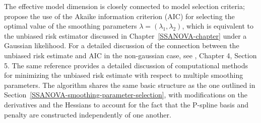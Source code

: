 The effective model dimension is closely connected to model selection criteria; \cite{eilers1996flexible} propose the use of the Akaike information criterion (AIC) for selecting the optimal value of the smoothing parameters $\lambda = \left(\lambda_1, \lambda_2\right)$, which is equivalent to the unbiased risk estimator discussed in Chapter~\ref{SSANOVA-chapter} under a Gaussian likelihood. For a detailed discussion of the connection between the unbiased risk estimate and AIC in the non-gaussian case, see \cite{wood2017generalized}, Chapter 4, Section 5. The same reference provides a detailed discussion of computational methods for minimizing the unbiased risk estimate with respect to multiple smoothing parameters. The algorithm shares the same basic structure as the one outlined in Section~\ref{SSANOVA-smoothing-parameter-selection}, with modifications on the derivatives and the Hessians to account for the fact that the P-spline basis and penalty are constructed independently of one another.



\subsubsection{}
{}
